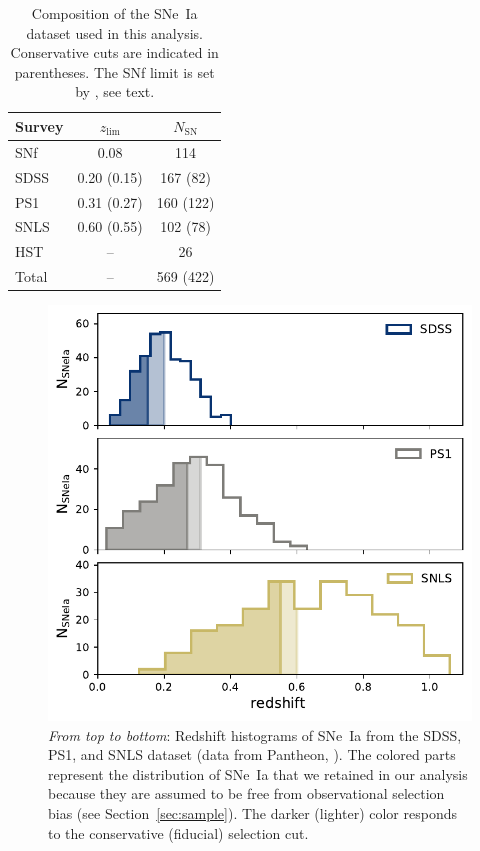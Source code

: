 \documentclass[]{aa}
\begin{document}
\begin{table}
    \centering
    \caption{Composition of the SNe~Ia dataset used in this analysis.
    Conservative cuts are indicated in parentheses. The SNf limit is set
by \cite{rigault2020}, see text.}
    \label{tab:sample}
    \begin{tabular}{l c c}
        \hline\hline
        Survey & $z_{\lim}$ & $N_{\mathrm{SN}}$ \\
        \hline
        SNf & 0.08 & 114 \\
        SDSS & 0.20 (0.15) & 167 (82)\\
        PS1 & 0.31 (0.27) & 160 (122)\\
        SNLS & 0.60 (0.55) & 102 (78)\\
        HST & -- & 26 \\
        \hline
        Total & -- & 569 (422) \\
        \hline
    \end{tabular}
\end{table}

\begin{figure}
    \centering
    \includegraphics[width=0.95\linewidth]{Article_figures/hist_surveys_cuts_55-cividis.pdf}
    \caption{\textit{From top to bottom}: Redshift histograms of SNe~Ia from the
        SDSS, PS1, and SNLS dataset (data from Pantheon,
        \citealt{scolnic2018a}). The colored parts represent the distribution of
        SNe~Ia that we retained in our analysis because they are assumed to be
    free from observational selection bias (see Section~\ref{sec:sample}). The
darker (lighter) color responds to the conservative (fiducial) selection cut.}
    \label{fig:cuts}
\end{figure}
\end{document}
